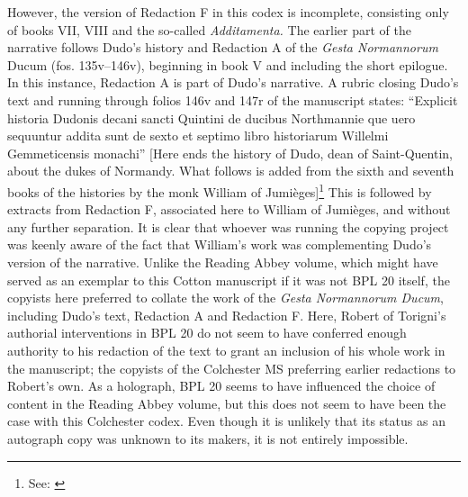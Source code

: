 \begin{paper}
However, the version of Redaction F in this codex is incomplete,
consisting only of books VII, VIII and the so-called \emph{Additamenta.}
The earlier part of the narrative follows Dudo's history and Redaction A
of the \emph{Gesta Normannorum} Ducum (fos. 135v--146v), beginning in
book V and including the short epilogue. In this instance, Redaction A
is part of Dudo's narrative. A rubric closing Dudo's text and running
through folios 146v and 147r of the manuscript states: ``Explicit
historia Dudonis decani sancti Quintini de ducibus Northmannie que uero
sequuntur addita sunt de sexto et septimo libro historiarum Willelmi
Gemmeticensis monachi'' [Here ends the history of Dudo, dean of Saint-Quentin, about the dukes of Normandy. What follows is added from the sixth and seventh books of the histories by the monk William of Jumièges]\footnote{See: \cite{noauthor_digitised_nodate}} This is followed by extracts from
Redaction F, associated here to William of Jumièges, and without any
further separation. It is clear that whoever was running the copying
project was keenly aware of the fact that William's work was
complementing Dudo's version of the narrative. Unlike the Reading Abbey
volume, which might have served as an exemplar to this Cotton manuscript
if it was not BPL 20 itself, the copyists here preferred to collate the
work of the \emph{Gesta Normannorum Ducum}, including Dudo's text,
Redaction A and Redaction F. Here, Robert of Torigni's authorial
interventions in BPL 20 do not seem to have conferred enough authority
to his redaction of the text to grant an inclusion of his whole work in
the manuscript; the copyists of the Colchester MS preferring earlier
redactions to Robert's own. As a holograph, BPL 20 seems to have
influenced the choice of content in the Reading Abbey volume, but this
does not seem to have been the case with this Colchester codex. 
Even though it is unlikely that its status as an autograph copy was unknown to its makers, 
it is not entirely impossible.


\end{paper}

